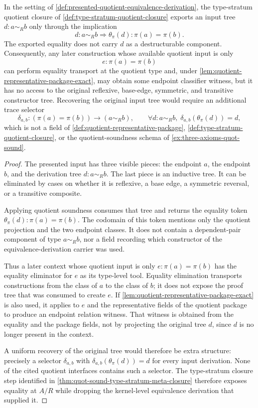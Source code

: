 \begin{proposition}
\label{prop:type-stratum-meta-closure-drops-equivalence-derivations}
In the setting of \autoref{def:presented-quotient-equivalence-derivation}, the type-stratum quotient closure of \autoref{def:type-stratum-quotient-closure} exports an input tree $d:a\sim_R b$ only through the implication
$$
d:a\sim_R b\Longrightarrow \theta_\pi(d):\pi(a)=\pi(b).
$$
The exported equality does not carry $d$ as a destructurable component. Consequently, any later construction whose available quotient input is only
$$
e:\pi(a)=\pi(b)
$$
can perform equality transport at the quotient type and, under \autoref{lem:quotient-representative-package-exact}, may obtain some endpoint classifier witness, but it has no access to the original reflexive, base-edge, symmetric, and transitive constructor tree. Recovering the original input tree would require an additional trace selector
$$
\delta_{a,b}:(\pi(a)=\pi(b))\to(a\sim_R b),
\qquad
\forall d:a\sim_R b,\; \delta_{a,b}(\theta_\pi(d))=d,
$$
which is not a field of \autoref{def:quotient-representative-package}, \autoref{def:type-stratum-quotient-closure}, or the quotient-soundness schema of \autoref{ex:three-axioms-quot-sound}.
\end{proposition}

\begin{proof}
The presented input has three visible pieces: the endpoint $a$, the endpoint $b$, and the derivation tree $d:a\sim_R b$. The last piece is an inductive tree. It can be eliminated by cases on whether it is reflexive, a base edge, a symmetric reversal, or a transitive composite.

Applying quotient soundness consumes that tree and returns the equality token $\theta_\pi(d):\pi(a)=\pi(b)$. The codomain of this token mentions only the quotient projection and the two endpoint classes. It does not contain a dependent-pair component of type $a\sim_R b$, nor a field recording which constructor of the equivalence-derivation carrier was used.

Thus a later context whose quotient input is only $e:\pi(a)=\pi(b)$ has the equality eliminator for $e$ as its type-level tool. Equality elimination transports constructions from the class of $a$ to the class of $b$; it does not expose the proof tree that was consumed to create $e$. If \autoref{lem:quotient-representative-package-exact} is also used, it applies to $e$ and the representative fields of the quotient package to produce an endpoint relation witness. That witness is obtained from the equality and the package fields, not by projecting the original tree $d$, since $d$ is no longer present in the context.

A uniform recovery of the original tree would therefore be extra structure: precisely a selector $\delta_{a,b}$ with $\delta_{a,b}(\theta_\pi(d))=d$ for every input derivation. None of the cited quotient interfaces contains such a selector. The type-stratum closure step identified in \autoref{thm:quot-sound-type-stratum-meta-closure} therefore exposes equality at $A/R$ while dropping the kernel-level equivalence derivation that supplied it.
\end{proof}

